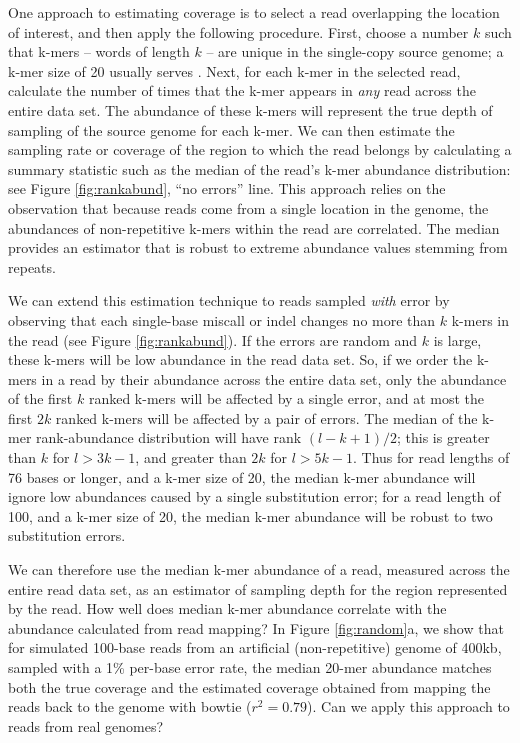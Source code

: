 \documentclass[10pt]{article}
\begin{document}
One approach to estimating coverage is to select a read overlapping
the location of interest, and then apply the following
procedure. First, choose a number $k$ such that k-mers -- words of
length $k$ -- are unique in the single-copy source genome; a k-mer
size of 20 usually serves \cite{pubmed12902383,pubmed19814784}.  Next, for each
k-mer in the selected read, calculate the number of times that the
k-mer appears in {\em any} read across the entire data set.  The
abundance of these k-mers will represent the true depth of sampling of
the source genome for each k-mer.  We can then estimate the sampling
rate or coverage of the region to which the read belongs by
calculating a summary statistic such as the median of the
read's k-mer abundance distribution: see Figure \ref{fig:rankabund},
``no errors'' line. This approach relies on the observation that
because reads come from a single location in the genome, the
abundances of non-repetitive k-mers within the read are correlated.
The median provides an estimator that is robust to extreme abundance
values stemming from repeats.

We can extend this estimation technique to reads sampled {\em with}
error by observing that each single-base miscall or indel changes no
more than $k$ k-mers in the read (see Figure \ref{fig:rankabund}).  If
the errors are random and $k$ is large, these k-mers will be low
abundance in the read data set.  So, if we order the k-mers in a read
by their abundance across the entire data set, only the abundance of
the first $k$ ranked k-mers will be affected by a single error, and at
most the first $2k$ ranked k-mers will be affected by a pair of
errors.  The median of the k-mer rank-abundance distribution will have
rank $(l - k + 1) / 2$; this is greater than $k$ for $l > 3k-1$, and
greater than $2k$ for $l > 5k-1$.  Thus for read lengths of 76 bases
or longer, and a k-mer size of 20, the median k-mer abundance will
ignore low abundances caused by a single substitution error; for a read
length of 100, and a k-mer size of 20, the median k-mer abundance will
be robust to two substitution errors.

We can therefore use the median k-mer abundance of a read, measured
across the entire read data set, as an estimator of sampling depth for
the region represented by the read. How well does median k-mer
abundance correlate with the abundance calculated from read mapping?
In Figure \ref{fig:random}a, we show that for simulated 100-base reads
from an artificial (non-repetitive) genome of 400kb, sampled with a
1\% per-base error rate, the median 20-mer abundance matches both the
true coverage and the estimated coverage obtained from mapping the
reads back to the genome with bowtie ($r^2 = 0.79$).  Can we apply
this approach to reads from real genomes?
\end{document}
